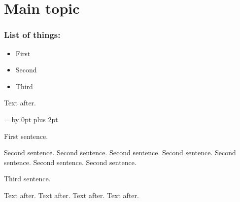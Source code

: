 \documentclass{article}
\makeatletter
\newcommand{\nonzeroparskip}{%
		\parindent=\z@
		\parskip=0.5\baselineskip \advance\parskip by 0pt plus 2pt
}
\newenvironment{headlist}[1]
	{%
		\subsubsection*{#1}%
		\begin{itemize}%
	}
	{\end{itemize}}
\newenvironment{outline}
	{\nonzeroparskip}
	{\vspace{\parskip}}
\makeatother
\begin{document}
\section{Main topic}

\begin{headlist}{List of things:}
\item First
\item Second
\item Third
\end{headlist}

Text after.

\begin{outline}
First sentence.

Second sentence.
Second sentence.
Second sentence.
Second sentence.
Second sentence.
Second sentence.
Second sentence.

Third sentence.
\end{outline}

Text after.
Text after.
Text after.
Text after.
\end{document}
